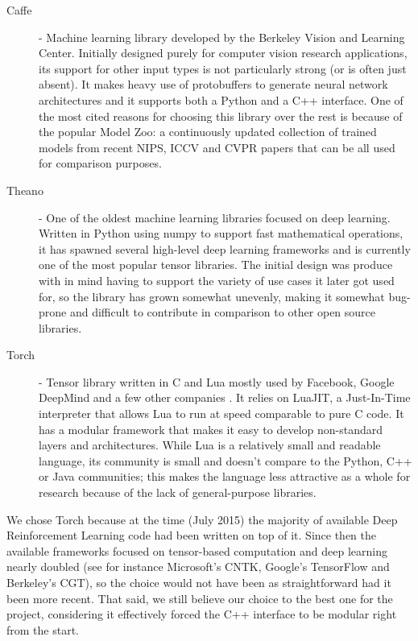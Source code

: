 \begin{description}
\item [Caffe] - Machine learning library developed by the Berkeley Vision and
  Learning Center. Initially designed purely for computer vision research
  applications, its support for other input types is not particularly strong (or
  is often just absent). It makes heavy use of protobuffers to generate neural
  network architectures and it supports both a Python and a C++ interface. One
  of the most cited reasons for choosing this library over the rest is because
  of the popular Model Zoo: a continuously updated collection of trained models
  from recent NIPS, ICCV and CVPR papers that can be all used for comparison
  purposes.
  
\item [Theano] - One of the oldest machine learning libraries focused on deep
  learning. Written in Python using numpy to support fast mathematical
  operations, it has spawned several high-level deep learning frameworks and is
  currently one of the most popular tensor libraries. The initial design was
  produce with in mind having to support the variety of use cases it later got
  used for, so the library has grown somewhat unevenly, making it somewhat
  bug-prone and difficult to contribute in comparison to other open source
  libraries.

\item [Torch] - Tensor library written in C and Lua mostly used by Facebook,
  Google DeepMind and a few other companies \cite{soumith}. It relies on LuaJIT,
  a Just-In-Time interpreter that allows Lua to run at speed comparable to pure
  C code. It has a modular framework that makes it easy to develop non-standard
  layers and architectures. While Lua is a relatively small and readable
  language, its community is small and doesn't compare to the Python, C++ or
  Java communities; this makes the language less attractive as a whole for
  research because of the lack of general-purpose libraries.
\end{description}

We chose Torch because at the time (July 2015) the majority of
available Deep Reinforcement Learning code had been written on top of it. Since
then the available frameworks focused on tensor-based computation and deep
learning nearly doubled (see for instance Microsoft's CNTK, Google's TensorFlow
and Berkeley's CGT), so the choice would not have been as straightforward had it
been more recent. That said, we still believe our choice to the best one for the
project, considering it effectively forced the C++ interface to be modular right
from the start.
 
